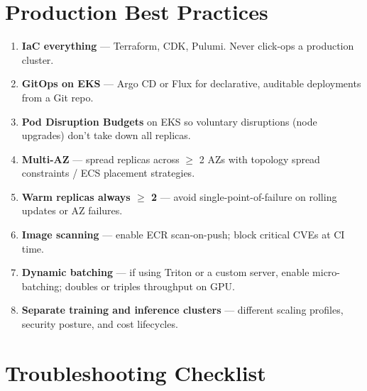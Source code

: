 \documentclass[11pt,a4paper]{article}
\begin{document}
\section{Production Best Practices}

\begin{enumerate}[leftmargin=*]
    \item \textbf{IaC everything} --- Terraform, CDK, Pulumi. Never click-ops
          a production cluster.
    \item \textbf{GitOps on EKS} --- Argo CD or Flux for declarative,
          auditable deployments from a Git repo.
    \item \textbf{Pod Disruption Budgets} on EKS so voluntary disruptions
          (node upgrades) don't take down all replicas.
    \item \textbf{Multi-AZ} --- spread replicas across $\geq$ 2 AZs with
          topology spread constraints / ECS placement strategies.
    \item \textbf{Warm replicas always $\geq$ 2} --- avoid single-point-of-failure
          on rolling updates or AZ failures.
    \item \textbf{Image scanning} --- enable ECR scan-on-push; block critical
          CVEs at CI time.
    \item \textbf{Dynamic batching} --- if using Triton or a custom server,
          enable micro-batching; doubles or triples throughput on GPU.
    \item \textbf{Separate training and inference clusters} --- different
          scaling profiles, security posture, and cost lifecycles.
\end{enumerate}

\section{Troubleshooting Checklist}
\end{document}
